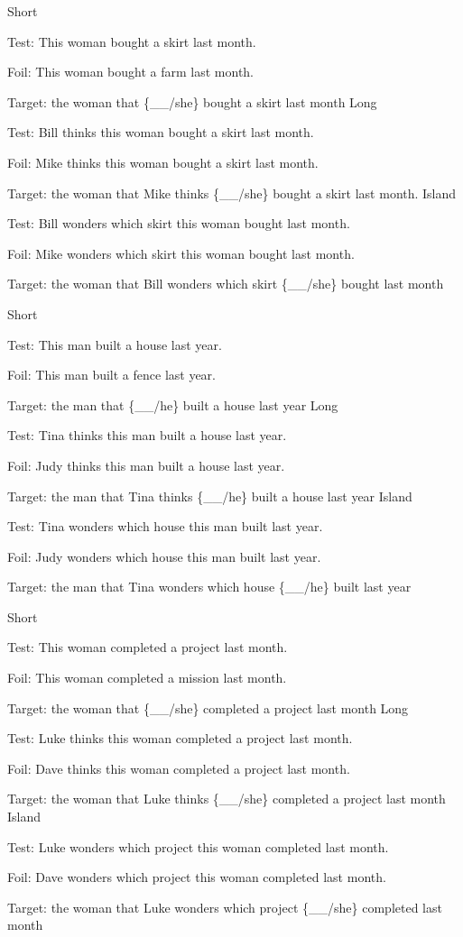 \pex %
\a Short\par\nobreak
Test: This woman bought a skirt last month.\par\nobreak
Foil: This woman bought a farm last month.\par\nobreak
Target: the woman that \{\_\_/she\} bought a skirt last month
\a Long\par\nobreak
Test: Bill thinks this woman bought a skirt last month.\par\nobreak
Foil: Mike thinks this woman bought a skirt last month.\par\nobreak
Target: the woman that Mike thinks \{\_\_/she\} bought a skirt last month.
\a Island\par\nobreak
Test: Bill wonders which skirt this woman bought last month.\par\nobreak
Foil: Mike wonders which skirt this woman bought last month.\par\nobreak
Target: the woman that Bill wonders which skirt \{\_\_/she\} bought last month
\xe

\pex %
\a Short\par\nobreak
Test: This man built a house last year.\par\nobreak
Foil: This man built a fence last year.\par\nobreak
Target: the man that \{\_\_/he\} built a house last year
\a Long\par\nobreak
Test: Tina thinks this man built a house last year.\par\nobreak
Foil: Judy thinks this man built a house last year.\par\nobreak
Target: the man that Tina thinks \{\_\_/he\} built a house last year
\a Island\par\nobreak
Test: Tina wonders which house this man built last year.\par\nobreak
Foil: Judy wonders which house this man built last year.\par\nobreak
Target: the man that Tina wonders which house \{\_\_/he\} built last year
\xe

\pex %
\a Short\par\nobreak
Test: This woman completed a project last month.\par\nobreak
Foil: This woman completed a mission last month.\par\nobreak
Target: the woman that \{\_\_/she\} completed a project last month
\a Long\par\nobreak
Test: Luke thinks this woman completed a project last month.\par\nobreak
Foil: Dave thinks this woman completed a project last month.\par\nobreak
Target: the woman that Luke thinks \{\_\_/she\} completed a project last month
\a Island\par\nobreak
Test: Luke wonders which project this woman completed last month.\par\nobreak
Foil: Dave wonders which project this woman completed last month.\par\nobreak
Target: the woman that Luke wonders which project \{\_\_/she\} completed last month
\xe

